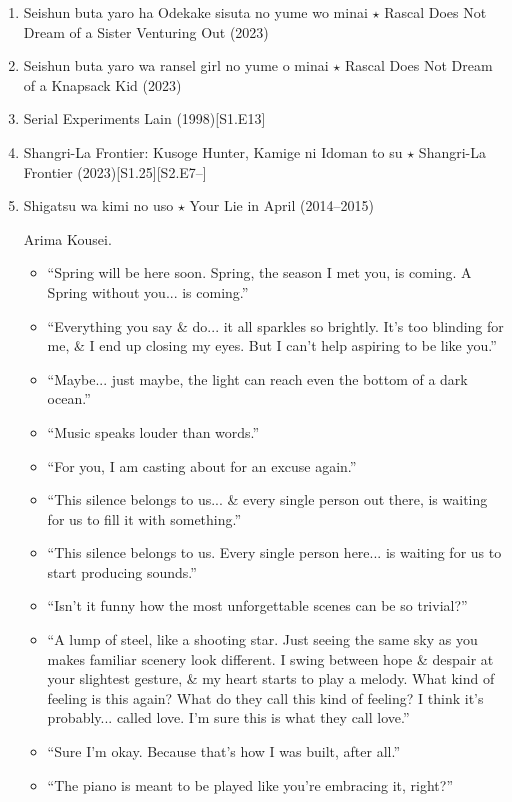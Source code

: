 \documentclass{article}
\begin{document}
\begin{enumerate}
    \item {\sc Seishun buta yaro ha Odekake sisuta no yume wo minai $\star$ Rascal Does Not Dream of a Sister Venturing Out} (2023)
    \item {\sc Seishun buta yaro wa ransel girl no yume o minai $\star$ Rascal Does Not Dream of a Knapsack Kid} (2023)
    \item {\sc Serial Experiments Lain} (1998)\hfill[S1.E13]
    \item {\sc Shangri-La Frontier: Kusoge Hunter, Kamige ni Idoman to su $\star$ Shangri-La Frontier} (2023)\hfill[S1.25][S2.E7--]
    \item {\sc Shigatsu wa kimi no uso $\star$ Your Lie in April} (2014--2015)
    
    {\sc Arima Kousei.}
    \begin{itemize}
    	\item ``Spring will be here soon. Spring, the season I met you, is coming. A Spring without you... is coming.''
    	\item ``Everything you say \& do... it all sparkles so brightly. It's too blinding for me, \& I end up closing my eyes. But I can't help aspiring to be like you.''
    	\item ``Maybe... just maybe, the light can reach even the bottom of a dark ocean.''
    	\item ``Music speaks louder than words.''
    	\item ``For you, I am casting about for an excuse again.''
    	\item ``This silence belongs to us... \& every single person out there, is waiting for us to fill it with something.''
    	\item ``This silence belongs to us. Every single person here... is waiting for us to start producing sounds.''
    	\item ``Isn't it funny how the most unforgettable scenes can be so trivial?''
    	\item ``A lump of steel, like a shooting star. Just seeing the same sky as you makes familiar scenery look different. I swing between hope \& despair at your slightest gesture, \& my heart starts to play a melody. What kind of feeling is this again? What do they call this kind of feeling? I think it's probably... called love. I'm sure this is what they call love.''
    	\item ``Sure I'm okay. Because that's how I was built, after all.''
    	\item ``The piano is meant to be played like you're embracing it, right?''

\end{itemize}
\end{enumerate}
\end{document}
